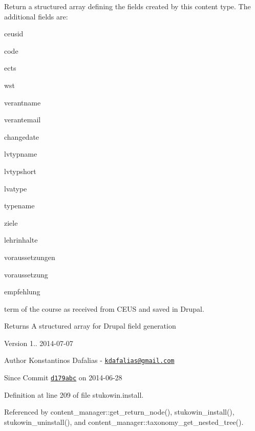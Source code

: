 Return a structured array defining the fields created by this content type. The additional fields are\+:
\begin{DoxyItemize}
\item ceusid
\item code
\item ects
\item wst
\item verantname
\item verantemail
\item changedate
\item lvtypname
\item lvtypshort
\item lvatype
\item typename
\item ziele
\item lehrinhalte
\item voraussetzungen
\item voraussetzung
\item empfehlung
\item term of the course as received from C\+E\+U\+S and saved in Drupal. \begin{DoxyReturn}{Returns}
A structured array for Drupal field generation
\end{DoxyReturn}
\begin{DoxyVersion}{Version}
1.. 2014-\/07-\/07 
\end{DoxyVersion}
\begin{DoxyAuthor}{Author}
Konstantinos Dafalias -\/ \href{mailto:kdafalias@gmail.com}{\tt kdafalias@gmail.\+com} 
\end{DoxyAuthor}
\begin{DoxySince}{Since}
Commit \href{http://github.com/TheJake123/DrupalModul/commit/d179abcc5e05743086cd67cf1ce30b08923a7183}{\tt d179abc} on 2014-\/06-\/28 
\end{DoxySince}

\end{DoxyItemize}

Definition at line 209 of file stukowin.\+install.



Referenced by content\+\_\+manager\+::get\+\_\+return\+\_\+node(), stukowin\+\_\+install(), stukowin\+\_\+uninstall(), and content\+\_\+manager\+::taxonomy\+\_\+get\+\_\+nested\+\_\+tree().



